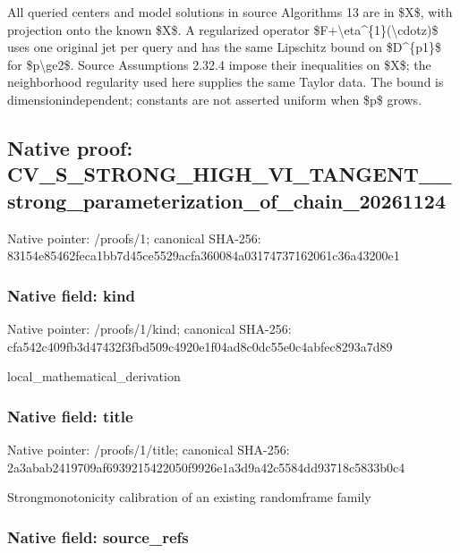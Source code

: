 \documentclass[10pt,a4paper]{article}
\begin{document}
All queried centers and model solutions in source Algorithms 13 are in \$X\$, with projection onto the known \$X\$. A regularized operator \$F+\textbackslash{}eta\textasciicircum{}\{1\}(\textbackslash{}cdotz)\$ uses one original jet per query and has the same Lipschitz bound on \$D\textasciicircum{}\{p1\}\$ for \$p\textbackslash{}ge2\$. Source Assumptions 2.32.4 impose their inequalities on \$X\$; the neighborhood regularity used here supplies the same Taylor data. The bound is dimensionindependent; constants are not asserted uniform when \$p\$ grows.


\subsection{Native proof: CV\_S\_STRONG\_HIGH\_VI\_TANG\allowbreak{}ENT\_\_strong\_parameteriza\allowbreak{}tion\_of\_chain\_20261124}


Native pointer: /proofs/1; canonical SHA-256: 83154e85462feca1bb7d45ce\allowbreak{}5529acfa360084a031747371\allowbreak{}62061c36a43200e1



\subsubsection{Native field: kind}


Native pointer: /proofs/1/kind; canonical SHA-256: cfa542c409fb3d47432f3fbd\allowbreak{}509c4920e1f04ad8c0dc55e0\allowbreak{}c4abfec8293a7d89


local\_mathematical\_derivation


\subsubsection{Native field: title}


Native pointer: /proofs/1/title; canonical SHA-256: 2a3abab2419709af69392154\allowbreak{}22050f9926e1a3d9a42c5584\allowbreak{}dd93718c5833b0c4


Strongmonotonicity calibration of an existing randomframe family


\subsubsection{Native field: source\_refs}
\end{document}
